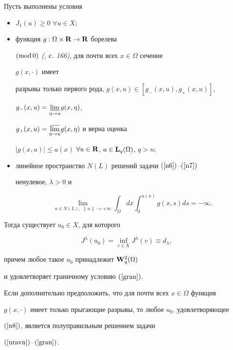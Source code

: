 \begin{thms} Пусть выполнены условия


\begin{itemize}


\item[1)] $J_1(u)\geq 0$ $\forall u\in X;$


\item[2)] функция $g : \Omega\times {\bold R} \rightarrow {\bold R}$ борелева


$(\operatorname{mod} 0)$ {\em (\cite{kar}, с. 166)}, для почти всех $x\in\Omega$ сечение


$g(x, \cdot)$ имеет


разрывы только первого рода, $g(x, u)\in [g_-(x, u), g_+(x, u)]$,


$g_-(x, u)=\underset{\eta\to u}\varliminf{}g(x, \eta)$,


$g_+(x, u)=\underset{\eta\to u}\varlimsup{}g(x, \eta)$ и верна оценка


$|g(x, u)|\leq a(x)$ $\forall u\in {\bold R}$, $a\in {\bold L}_q(\Omega)$, $q>n;$


\item[3)] линейное пространство $N(L)$ решений задачи $(\ref{n6})$--$(\ref{n7})$


ненулевое, $\lambda>0$ и


$$


\lim\limits_{u \in N(L),\;\| u \| \to +\infty}


\displaystyle\int_{\Omega}dx\int_{0}^{u(x)} g(x,s)ds=-\infty.


$$


\end{itemize}





Тогда существует $u_0\in X$, для которого


\begin{equation}


\label{n8}


J^{\lambda}(u_0)=\inf_{v\in X}J^{\lambda}(v)\equiv d_{\lambda},


\end{equation}


причем любое такое $u_0$ принадлежит ${\bold W}_q^2(\Omega)$


и удовлетворяет граничному условию $(\ref{gran})$.


Если дополнительно предположить, что для почти всех $x\in\Omega$ функция


$g(x, \cdot)$ имеет только прыгающие разрывы, то любое $u_0$, удовлетворяющее


$(\ref{n8})$, является полуправильным решением задачи 


$(\ref{uravn})$--$(\ref{gran})$.


\label{t3}


\end{thms}





